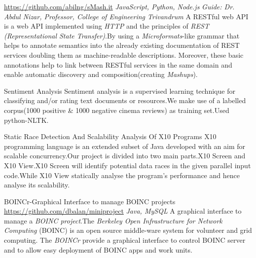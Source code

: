 \documentclass[11pt, a4paper, sans]{moderncv}
\begin{document}
{\newline \url{https://github.com/abilng/sMash.it}}
{\hfill \textit{JavaScript, Python, Node.js}}
{\newline \textit{Guide: Dr. Abdul Nizar, Professor, College of Engineering Trivandrum}}
{A RESTful web API is a web API implemented using \textit{HTTP }and the principles of \textit{REST (Representational State Transfer)}.By using  a \textit{Microformats}-like grammar that helps to annotate semantics into the already existing documentation of REST services doubling them as machine-readable descriptions. Moreover, these basic annotations help to link between RESTful services in the same domain and enable automatic discovery and composition(creating \textit{Mashups}).\newline}


{Sentiment Analysis}{}{}{}
{Sentiment analysis is a supervised learning technique for classifying and/or rating text documents or resources.We make use of a labelled corpus(1000 positive \& 1000 negative cinema reviews) as training set.Used python-NLTK.\newline}

{Static Race Detection And Scalability Analysis Of X10 Programs}{}{}{}
{X10 programming language is an extended subset of Java developed with an aim for
scalable concurrency.Our project is divided into two main parts.X10 Screen and X10 View.X10 Screen will identify potential data races in the given parallel input code.While X10 View statically analyse the program's performance and hence analyse its scalability.\newline}

{BOINCr-Graphical Interface to manage BOINC projects}
{\newline \url{https://github.com/dbalan/miniproject}}{}
{\hfill \textit{Java, MySQL}}
{A graphical interface to manage a \textit{BOINC project}.The \textit{Berkeley Open Infrastructure for Network Computing }(BOINC) is an open source middle-ware system for volunteer and grid computing. The \textit{BOINCr} provide a graphical interface to control BOINC server and to allow easy deployment of BOINC apps and work units.\newline}
\end{document}
